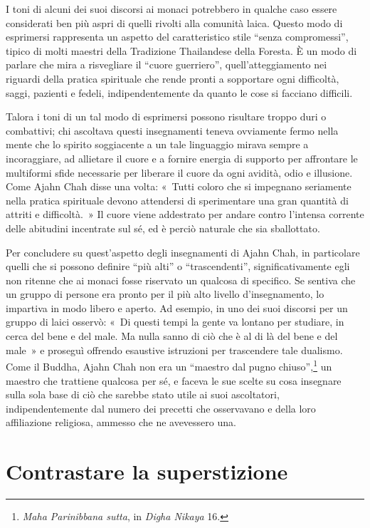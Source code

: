 I toni di alcuni dei suoi discorsi ai monaci potrebbero in qualche caso
essere considerati ben più aspri di quelli rivolti alla comunità laica.
Questo modo di esprimersi rappresenta un aspetto del caratteristico
stile ``senza compromessi'', tipico di molti maestri della Tradizione
Thailandese della Foresta. È un modo di parlare che mira a risvegliare
il ``cuore guerriero'', quell'atteggiamento nei riguardi della pratica
spirituale che rende pronti a sopportare ogni difficoltà, saggi,
pazienti e fedeli, indipendentemente da quanto le cose si facciano
difficili.

Talora i toni di un tal modo di esprimersi possono risultare troppo duri
o combattivi; chi ascoltava questi insegnamenti teneva ovviamente fermo
nella mente che lo spirito soggiacente a un tale linguaggio mirava
sempre a incoraggiare, ad allietare il cuore e a fornire energia di
supporto per affrontare le multiformi sfide necessarie per liberare il
cuore da ogni avidità, odio e illusione. Come Ajahn Chah disse una
volta: «~Tutti coloro che si impegnano seriamente nella pratica
spirituale devono attendersi di sperimentare una gran quantità di
attriti e difficoltà.~» Il cuore viene addestrato per andare contro
l'intensa corrente delle abitudini incentrate sul sé, ed è perciò
naturale che sia sballottato.

Per concludere su quest'aspetto degli insegnamenti di Ajahn Chah, in
particolare quelli che si possono definire ``più alti'' o
``trascendenti'', significativamente egli non ritenne che ai monaci
fosse riservato un qualcosa di specifico. Se sentiva che un gruppo di
persone era pronto per il più alto livello d'insegnamento, lo impartiva
in modo libero e aperto. Ad esempio, in uno dei suoi discorsi per un
gruppo di laici osservò: «~Di questi tempi la gente va lontano per
studiare, in cerca del bene e del male. Ma nulla sanno di ciò che è al
di là del bene e del male~» e proseguì offrendo esaustive istruzioni per
trascendere tale dualismo. Come il Buddha, Ajahn Chah non era un
``maestro dal pugno chiuso'',\footnote{\emph{Maha Parinibbana sutta}, in
  \emph{Digha Nikaya} 16.} un maestro che trattiene qualcosa per sé, e
faceva le sue scelte su cosa insegnare sulla sola base di ciò che
sarebbe stato utile ai suoi ascoltatori, indipendentemente dal numero
dei precetti che osservavano e della loro affiliazione religiosa,
ammesso che ne avevessero una.

\section{Contrastare la superstizione}

